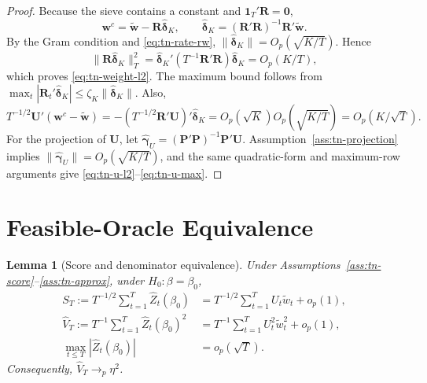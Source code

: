 \documentclass[11pt]{article}
\newtheorem{lemma}{Lemma}
\begin{document}
\begin{proof}
Because the sieve contains a constant and \(\bm1_T'\bm R=\bm0\),
\[
    \bm w^c=\widetilde{\bm w}-\bm R\widehat{\bm\delta}_K,
    \qquad
    \widehat{\bm\delta}_K=(\bm R'\bm R)^{-1}\bm R'\widetilde{\bm w}.
\]
By the Gram condition and \eqref{eq:tn-rate-rw}, \(\|\widehat{\bm\delta}_K\|=O_p(\sqrt{K/T})\). Hence
\[
    \|\bm R\widehat{\bm\delta}_K\|_T^2
    =\widehat{\bm\delta}_K'(T^{-1}\bm R'\bm R)\widehat{\bm\delta}_K=O_p(K/T),
\]
which proves \eqref{eq:tn-weight-l2}. The maximum bound follows from \(\max_t|\bm R_t'\widehat{\bm\delta}_K|\leq\zeta_K\|\widehat{\bm\delta}_K\|\). Also,
\[
    T^{-1/2}\bm U'(\bm w^c-\widetilde{\bm w})
      =-(T^{-1/2}\bm R'\bm U)'\widehat{\bm\delta}_K
      =O_p(\sqrt K)O_p(\sqrt{K/T})=O_p(K/\sqrt T).
\]
For the projection of \(\bm U\), let \(\widehat{\bm\gamma}_U=(\bm P'\bm P)^{-1}\bm P'\bm U\). Assumption~\ref{ass:tn-projection} implies \(\|\widehat{\bm\gamma}_U\|=O_p(\sqrt{K/T})\), and the same quadratic-form and maximum-row arguments give \eqref{eq:tn-u-l2}--\eqref{eq:tn-u-max}.
\end{proof}

\section{Feasible-Oracle Equivalence}

\begin{lemma}[Score and denominator equivalence]
\label{lem:tn-score}
Under Assumptions~\ref{ass:tn-score}--\ref{ass:tn-approx}, under \(H_0:\beta=\beta_0\),
\begin{align}
    S_T:=T^{-1/2}\sum_{t=1}^T\widehat Z_t(\beta_0)
      &=T^{-1/2}\sum_{t=1}^TU_t\widetilde w_t+o_p(1),
      \label{eq:tn-num}\\
    \widehat V_T:=T^{-1}\sum_{t=1}^T\widehat Z_t(\beta_0)^2
      &=T^{-1}\sum_{t=1}^TU_t^2\widetilde w_t^2+o_p(1),
      \label{eq:tn-var}\\
    \max_{t\leq T}|\widehat Z_t(\beta_0)|&=o_p(\sqrt T).
      \label{eq:tn-max}
\end{align}
Consequently, \(\widehat V_T\to_p\eta^2\).
\end{lemma}
\end{document}
